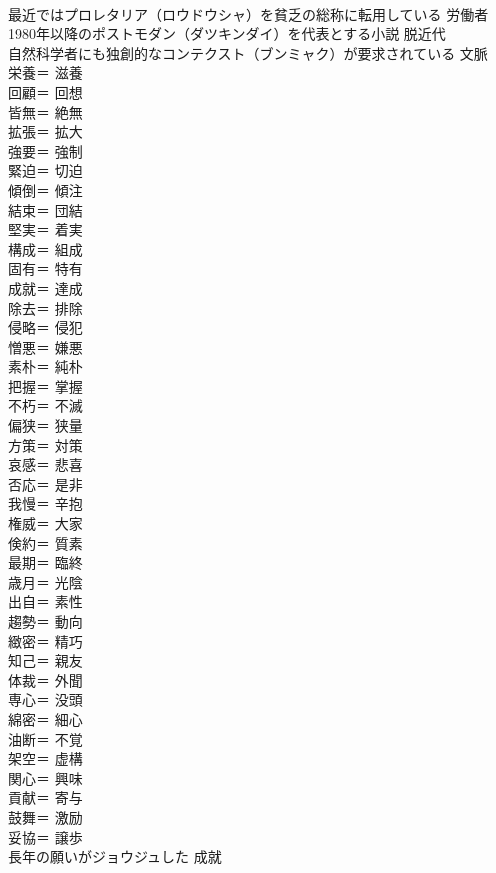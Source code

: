 \documentclass[8pt]{extreport}
\begin{document}
\begin{CJK}{UTF8}{min}
\\	最近ではプロレタリア（ロウドウシャ）を貧乏の総称に転用している	労働者
\\	1980年以降のポストモダン（ダツキンダイ）を代表とする小説	脱近代
\\	自然科学者にも独創的なコンテクスト（ブンミャク）が要求されている	文脈
\\	栄養＝	滋養
\\	回顧＝	回想
\\	皆無＝	絶無
\\	拡張＝	拡大
\\	強要＝	強制
\\	緊迫＝	切迫
\\	傾倒＝	傾注
\\	結束＝	団結
\\	堅実＝	着実
\\	構成＝	組成
\\	固有＝	特有
\\	成就＝	達成
\\	除去＝	排除
\\	侵略＝	侵犯
\\	憎悪＝	嫌悪
\\	素朴＝	純朴
\\	把握＝	掌握
\\	不朽＝	不滅
\\	偏狭＝	狭量
\\	方策＝	対策
\\	哀感＝	悲喜
\\	否応＝	是非
\\	我慢＝	辛抱
\\	権威＝	大家
\\	倹約＝	質素
\\	最期＝	臨終
\\	歳月＝	光陰
\\	出自＝	素性
\\	趨勢＝	動向
\\	緻密＝	精巧
\\	知己＝	親友
\\	体裁＝	外聞
\\	専心＝	没頭
\\	綿密＝	細心
\\	油断＝	不覚
\\	架空＝	虚構
\\	関心＝	興味
\\	貢献＝	寄与
\\	鼓舞＝	激励
\\	妥協＝	譲歩
\\	長年の願いがジョウジュした	成就

\end{CJK}
\end{document}
